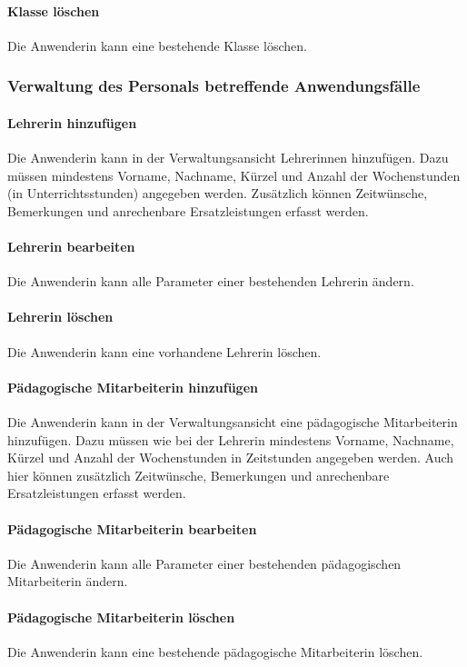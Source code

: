 \documentclass[fontsize=12pt,paper=a4,twoside]{scrartcl}
\begin{document}
\paragraph{Klasse löschen} Die Anwenderin kann eine bestehende Klasse löschen.

\subsubsection{Verwaltung des Personals betreffende Anwendungsfälle}

\paragraph{Lehrerin hinzufügen}
Die Anwenderin kann in der Verwaltungsansicht Lehrerinnen hinzufügen. Dazu müssen mindestens Vorname, Nachname, Kürzel und Anzahl der Wochenstunden (in Unterrichtsstunden) angegeben werden. Zusätzlich können Zeitwünsche, Bemerkungen und anrechenbare Ersatzleistungen erfasst werden.

\paragraph{Lehrerin bearbeiten}
Die Anwenderin kann alle Parameter einer bestehenden Lehrerin ändern.

\paragraph{Lehrerin löschen}
Die Anwenderin kann eine vorhandene Lehrerin löschen.

\paragraph{Pädagogische Mitarbeiterin hinzufügen}
Die Anwenderin kann in der Verwaltungsansicht eine pädagogische Mitarbeiterin hinzufügen. Dazu müssen wie bei der Lehrerin mindestens Vorname, Nachname, Kürzel und Anzahl der Wochenstunden in Zeitstunden angegeben werden. Auch hier können zusätzlich Zeitwünsche, Bemerkungen und anrechenbare Ersatzleistungen erfasst werden.

\paragraph{Pädagogische Mitarbeiterin bearbeiten}
Die Anwenderin kann alle Parameter einer bestehenden pädagogischen Mitarbeiterin ändern.

\paragraph{Pädagogische Mitarbeiterin löschen}
Die Anwenderin kann eine bestehende pädagogische Mitarbeiterin löschen.
\end{document}
